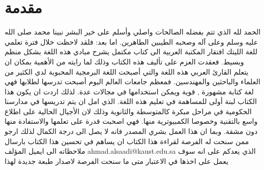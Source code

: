 \chapter{مقدمة}
الحمد لله الذي تتم بفضله الصالحات واصلي وأسلم على خير البشر نبينا محمد صلى الله عليه وسلم وعلى آله وصحبه الطيبين الطاهرين. اما بعد:
فلقد لاحظت خلال فترة تعلمي للغة الليتك افتقار المكتبة العربية الى كتاب مكتمل يشرح مبادي هذه اللغة بشكل منظم وبسيط. فعقدت العزم على تأليف هذه الكتاب وذلك لما رايته من الأهمية بمكان ان يتعلم القارئ العربي هذه اللغة والتي أصبحت اللغة البرمجية المحبوبة لدي الكثير من العلماء والباحثين والمهندسين. فمعظم جامعات العالم اليوم أصبحت تدرسها لطلابها فهي لغة  كتابة مشهورة , قوية ويمكن استخدامها في مجالات عدة. لذلك اردت ان يكون هذا الكتاب لبنة أولى للمساهمة في تعليم هذه اللغة. الذي امل ان يتم تدريسها في مدارسنا الحكومية في مراحل مبكرة كالمتوسطة والثانوية وذلك لان الأجيال الحالية على اطلاع واسع بالتقنية وخصوصا الكمبيوترية منها. فهي اصحبت قدرة على تعلمها والاستفادة منها دون مشقة. وبما ان هذا العمل بشري المصدر فانه لا يصل الى درجة الكمال لذلك ارجو ممن سنحت له الفرصة لقراءة هذا الكتاب ان يساهم في تحسين هذا الكتاب بارسال ملاحظاته الى ايميل المؤلف 
ahmad.alsaadi@kaust.edu.sa
 الذي يعدكم على انه سوف يعمل على اخذها في الاعتبار متى ما سنحت الفرصة لاصدار طبعة جديدة لهذا 
